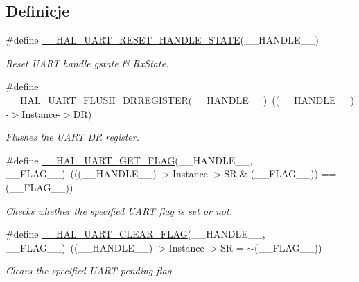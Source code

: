 \subsection*{Definicje}
\begin{DoxyCompactItemize}
\item 
\#define \hyperlink{group___u_a_r_t___exported___macros_ga19deab848407b106998416c78092fa9b}{\+\_\+\+\_\+\+H\+A\+L\+\_\+\+U\+A\+R\+T\+\_\+\+R\+E\+S\+E\+T\+\_\+\+H\+A\+N\+D\+L\+E\+\_\+\+S\+T\+A\+TE}(\+\_\+\+\_\+\+H\+A\+N\+D\+L\+E\+\_\+\+\_\+)
\begin{DoxyCompactList}\small\item\em Reset U\+A\+RT handle gstate \& Rx\+State. \end{DoxyCompactList}\item 
\#define \hyperlink{group___u_a_r_t___exported___macros_gafc4f20cb0f29ba146c9bc14167c52744}{\+\_\+\+\_\+\+H\+A\+L\+\_\+\+U\+A\+R\+T\+\_\+\+F\+L\+U\+S\+H\+\_\+\+D\+R\+R\+E\+G\+I\+S\+T\+ER}(\+\_\+\+\_\+\+H\+A\+N\+D\+L\+E\+\_\+\+\_\+)~((\+\_\+\+\_\+\+H\+A\+N\+D\+L\+E\+\_\+\+\_\+)-\/$>$Instance-\/$>$DR)
\begin{DoxyCompactList}\small\item\em Flushes the U\+A\+RT DR register. \end{DoxyCompactList}\item 
\#define \hyperlink{group___u_a_r_t___exported___macros_ga261fe8a2afe84ec048113654266c5bf6}{\+\_\+\+\_\+\+H\+A\+L\+\_\+\+U\+A\+R\+T\+\_\+\+G\+E\+T\+\_\+\+F\+L\+AG}(\+\_\+\+\_\+\+H\+A\+N\+D\+L\+E\+\_\+\+\_\+,  \+\_\+\+\_\+\+F\+L\+A\+G\+\_\+\+\_\+)~(((\+\_\+\+\_\+\+H\+A\+N\+D\+L\+E\+\_\+\+\_\+)-\/$>$Instance-\/$>$SR \& (\+\_\+\+\_\+\+F\+L\+A\+G\+\_\+\+\_\+)) == (\+\_\+\+\_\+\+F\+L\+A\+G\+\_\+\+\_\+))
\begin{DoxyCompactList}\small\item\em Checks whether the specified U\+A\+RT flag is set or not. \end{DoxyCompactList}\item 
\#define \hyperlink{group___u_a_r_t___exported___macros_ga9bd035161d41cde4f2568c7af06493bf}{\+\_\+\+\_\+\+H\+A\+L\+\_\+\+U\+A\+R\+T\+\_\+\+C\+L\+E\+A\+R\+\_\+\+F\+L\+AG}(\+\_\+\+\_\+\+H\+A\+N\+D\+L\+E\+\_\+\+\_\+,  \+\_\+\+\_\+\+F\+L\+A\+G\+\_\+\+\_\+)~((\+\_\+\+\_\+\+H\+A\+N\+D\+L\+E\+\_\+\+\_\+)-\/$>$Instance-\/$>$SR = $\sim$(\+\_\+\+\_\+\+F\+L\+A\+G\+\_\+\+\_\+))
\begin{DoxyCompactList}\small\item\em Clears the specified U\+A\+RT pending flag. \end{DoxyCompactList}\item 

\end{DoxyCompactItemize}
